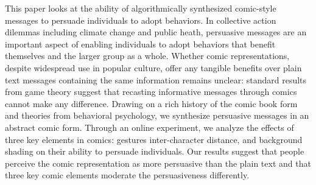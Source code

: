 
This paper looks at the ability of algorithmically synthesized comic-style messages to persuade individuals to adopt behaviors. In collective action dilemmas including climate change and public heath, persuasive messages are an important aspect of enabling individuals to adopt behaviors that benefit themselves and the larger group as a whole. Whether comic representations, despite widespread use in popular culture, offer any tangible benefits over plain text messages containing the same information remains unclear: standard results from game theory suggest that recasting informative messages through comics cannot make any difference. Drawing on a rich history of the comic book form and theories from behavioral psychology, we synthesize persuasive messages in an abstract comic form. Through an online experiment, we analyze the effects of three key elements in comics: gestures inter-character distance, and background shading on their ability to persuade individuals. Our results suggest that people perceive the comic representation as more persuasive than the plain text and that three key comic elements moderate the persuasiveness differently.
